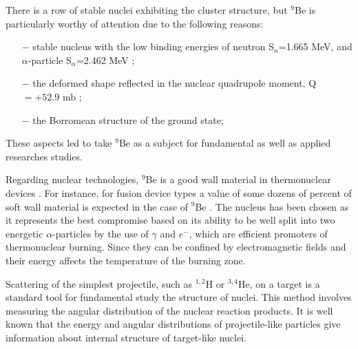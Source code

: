 \documentclass[10pt]{iopart}
\begin{document}
There is a row of stable nuclei exhibiting the cluster structure, but $^9$Be is particularly worthy of attention due to the following reasons: \begin{itemize}
\item[$-$] stable nucleus with the low binding energies of neutron S$_n$=1.665 MeV, and $\alpha$-particle S$_\alpha$=2.462 MeV \cite{separationneutron};
\item[$-$] the deformed shape reflected in the nuclear quadrupole moment, Q$=+52.9 $ mb \cite{quadrupole};
\item[$-$]  the Borromean structure of the ground state;
\end{itemize}
These aspects led to take $^9$Be as a subject for fundamental  as well as applied researches  studies.

Regarding nuclear technologies, $^9$Be is a good wall material in thermonuclear devices \cite{kukulin2010, seksembayev2018}.
For instance, for fusion device types a value of some dozens of percent of soft wall material is expected in the case of $^9$Be \cite{seksembayev2018}.
The nucleus  has been chosen as it represents the best compromise based  on its ability to be well split into two energetic $\alpha$-particles by the use of $\gamma$ and $e^-$, which are efficient promoters of thermonuclear burning. Since they can be confined by electromagnetic fields and their energy affects the temperature of the burning zone.

Scattering of the simplest projectile, such as ${}^{1,2}$H or ${}^{3,4}$He, on a target is a standard tool for fundamental study the structure of nuclei. This method involves measuring the angular distribution of the nuclear reaction products. It is well known that the energy and angular distributions of projectile-like particles give information about internal structure of target-like nuclei.
	
\end{document}
